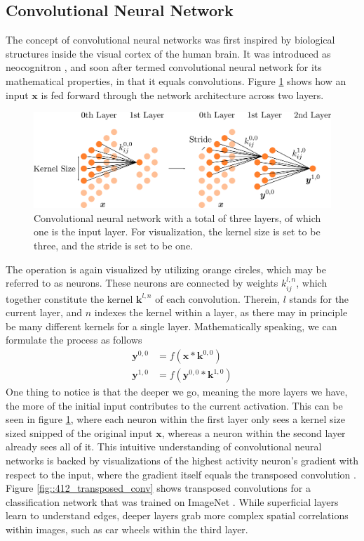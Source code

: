 \subsection{Convolutional Neural Network}
The concept of convolutional neural networks was first inspired by biological structures inside the visual cortex of the human brain. It was introduced as neocognitron \cite{fukushima1980neocognitron}, and soon after termed convolutional neural network for its mathematical properties, in that it equals convolutions. Figure \ref{fig::412_convolutional} shows how an input $\bm{x}$ is fed forward through the network architecture across two layers.   
\begin{figure}[h!]
	\centering
	\includegraphics[scale=.28]{chapters/04_principles_of_machine_learning/img/convolutional.png}
	\caption{Convolutional neural network with a total of three layers, of which one is the input layer. For visualization, the kernel size is set to be three, and the stride is set to be one.}
	\label{fig::412_convolutional}
\end{figure}
The operation is again visualized by utilizing orange circles, which may be referred to as neurons. These neurons are connected by weights $k^{l,n}_{ij}$, which together constitute the kernel $\bm{k}^{l,n}$ of each convolution. Therein, $l$ stands for the current layer, and $n$ indexes the kernel within a layer, as there may in principle be many different kernels for a single layer. Mathematically speaking, we can formulate the process as follows
\begin{align}
	\bm{y}^{0,0} &= f(\bm{x}*\bm{k}^{0,0}) \\
	\bm{y}^{1,0} &= f(\bm{y}^{0,0}*\bm{k}^{1,0})	
\end{align}
One thing to notice is that the deeper we go, meaning the more layers we have, the more of the initial input contributes to the current activation. This can be seen in figure \ref{fig::412_convolutional}, where each neuron within the first layer only sees a kernel size sized snipped of the original input $\bm{x}$, whereas a neuron within the second layer already sees all of it. This intuitive understanding of convolutional neural networks is backed by visualizations of the highest activity neuron's gradient with respect to the input, where the gradient itself equals the transposed convolution \cite{simonyan2013deep}.  Figure \ref{fig::412_transposed_conv} shows transposed convolutions for a classification network that was trained on ImageNet \cite{deng2009imagenet}. While superficial layers learn to understand edges, deeper layers grab more complex spatial correlations within images, such as car wheels within the third layer.
